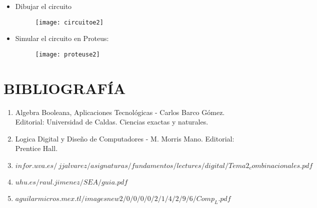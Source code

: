 \documentclass{article}
\begin{document}
\begin{itemize}
\begin{figure}[H]
                \end{figure}
            \item Dibujar el circuito
                \begin{figure}[H]
                    \centering
                    \texttt{[image: circuitoe2]}
                    \end{figure}
            \item Simular el circuito en Proteus:
                \begin{figure}[H]
                    \centering
                    \texttt{[image: proteuse2]}
                    \end{figure}
            \end{itemize}
    \newpage
    \part{BIBLIOGRAFÍA} 
        \newline
        \begin{enumerate}
        \item Algebra Booleana, Aplicaciones Tecnológicas - Carlos Barco Gómez. Editorial: Universidad de Caldas. Ciencias exactas y naturales. 
        \newline
        \item Logica Digital y Diseño de Computadores - M. Morris Mano. Editorial: Prentice Hall.
        \newline
        \item $infor.uva.es/~jjalvarez/asignaturas/fundamentos/lectures/digital/Tema2_combinacionales.pdf$
        \newline
        \item $uhu.es/raul.jimenez/SEA/guia.pdf$
        \newline
        \item $aguilarmicros.mex.tl/imagesnew2/0/0/0/0/2/1/4/2/9/6/Comp_L.pdf$
        \end{enumerate}
\end{document}
